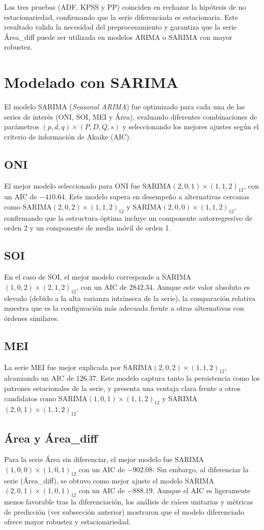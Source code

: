 Las tres pruebas (ADF, KPSS y PP) coinciden en rechazar la hipótesis de no estacionariedad, 
confirmando que la serie diferenciada es estacionaria. Este resultado valida la 
necesidad del preprocesamiento y garantiza que la serie Área\_diff puede ser utilizada en 
modelos ARIMA o SARIMA con mayor robustez. 


\section{Modelado con SARIMA}

El modelo SARIMA (\textit{Seasonal ARIMA}) fue optimizado para cada una de las series de interés (ONI, SOI, MEI y Área), evaluando diferentes combinaciones de parámetros $(p,d,q)\times(P,D,Q,s)$ y seleccionando los mejores ajustes según el criterio de información de Akaike (AIC). 

\subsection{ONI}
El mejor modelo seleccionado para ONI fue SARIMA$(2,0,1)\times(1,1,2)_{12}$, con un AIC de $-410.64$. Este modelo supera en desempeño a alternativas cercanas como SARIMA$(2,0,2)\times(1,1,2)_{12}$ y SARIMA$(2,0,0)\times(1,1,2)_{12}$, confirmando que la estructura óptima incluye un componente autorregresivo de orden 2 y un componente de media móvil de orden 1.

\subsection{SOI}
En el caso de SOI, el mejor modelo corresponde a SARIMA$(1,0,2)\times(2,1,2)_{12}$, con un AIC de $2842.34$. Aunque este valor absoluto es elevado (debido a la alta varianza intrínseca de la serie), la comparación relativa muestra que es la configuración más adecuada frente a otras alternativas con órdenes similares.

\subsection{MEI}
La serie MEI fue mejor explicada por SARIMA$(2,0,2)\times(1,1,2)_{12}$, alcanzando un AIC de $126.37$. Este modelo captura tanto la persistencia como los patrones estacionales de la serie, y presenta una ventaja clara frente a otros candidatos como SARIMA$(1,0,1)\times(1,1,2)_{12}$ y SARIMA$(2,0,1)\times(1,1,2)_{12}$.

\subsection{Área y Área\_diff}
Para la serie Área sin diferenciar, el mejor modelo fue SARIMA$(1,0,0)\times(1,0,1)_{12}$ con un AIC de $-902.08$. Sin embargo, al diferenciar la serie (Área\_diff), se obtuvo como mejor ajuste el modelo SARIMA$(2,0,1)\times(1,0,1)_{12}$ con un AIC de $-888.19$. Aunque el AIC es ligeramente menos favorable tras la diferenciación, los análisis de raíces unitarias y métricas de predicción (ver subsección anterior) mostraron que el modelo diferenciado ofrece mayor robustez y estacionariedad.

